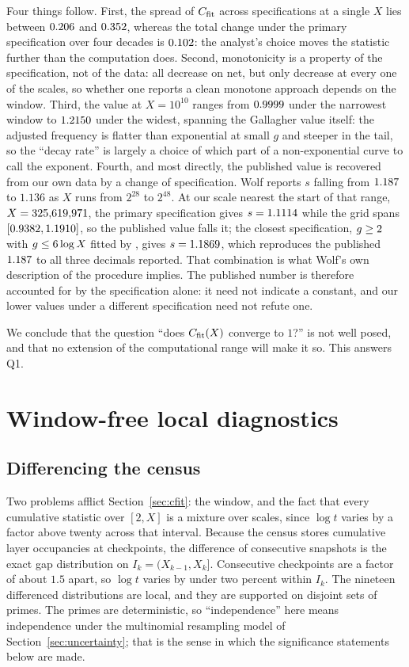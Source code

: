 \documentclass[11pt,a4paper]{article}
\begin{document}
Four things follow. First, the spread of $C_{\mathrm{fit}}$ across specifications at a single $X$ lies between $0.206$ and $0.352$, whereas the total change under the primary specification over four decades is $0.102$: the analyst's choice moves the statistic further than the computation does. Second, monotonicity is a property of the specification, not of the data: all \nSpecs{} decrease on net, but only \nMonoDec{} decrease at every one of the \nScales{} scales, so whether one reports a clean monotone approach depends on the window. Third, the value at $X=10^{10}$ ranges from $0.9999$ under the narrowest window to $1.2150$ under the widest, spanning the Gallagher value itself: the adjusted frequency is flatter than exponential at small $g$ and steeper in the tail, so the ``decay rate'' is largely a choice of which part of a non-exponential curve to call the exponent. Fourth, and most directly, the published value is recovered from our own data by a change of specification. Wolf \cite{Wolf2011} reports $s$ falling from $1.187$ to $1.136$ as $X$ runs from $2^{28}$ to $2^{48}$. At our scale nearest the start of that range, $X=325{,}619{,}971$, the primary specification gives $s=1.1114$ while the grid spans $[0.9382,1.1910]$, so the published value falls \wolfInside{} it; the closest specification, $g\ge2$ with $g\le6\log X$ fitted by \wolfBestEst{}, gives $s=1.1869$, which reproduces the published $1.187$ to all three decimals reported. That combination is what Wolf's own description of the procedure implies. The published number is therefore accounted for by the specification alone: it need not indicate a constant, and our lower values under a different specification need not refute one.

We conclude that the question ``does $C_{\mathrm{fit}}(X)$ converge to $1$?'' is not well posed, and that no extension of the computational range will make it so. This answers Q1.

\section{Window-free local diagnostics}
\label{sec:local}

\subsection{Differencing the census}

Two problems afflict Section~\ref{sec:cfit}: the window, and the fact that every cumulative statistic over $[2,X]$ is a mixture over scales, since $\log t$ varies by a factor above twenty across that interval. Because the census stores cumulative layer occupancies at \nScales{} checkpoints, the difference of consecutive snapshots is the exact gap distribution on $I_k=(X_{k-1},X_k]$. Consecutive checkpoints are a factor of about $1.5$ apart, so $\log t$ varies by under two percent within $I_k$. The nineteen differenced distributions are local, and they are supported on disjoint sets of primes. The primes are deterministic, so ``independence'' here means independence under the multinomial resampling model of Section~\ref{sec:uncertainty}; that is the sense in which the significance statements below are made.
\end{document}

